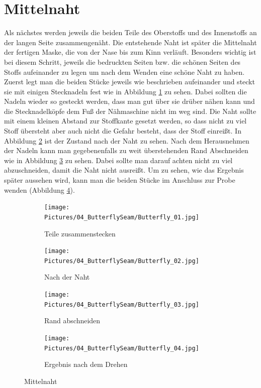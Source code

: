\documentclass[12pt,parskip=full]{scrartcl}
\begin{document}
\section{Mittelnaht}
Als nächstes werden jeweils die beiden Teile des Oberstoffs und des Innenstoffs an der langen Seite zusammengenäht. Die entstehende Naht ist später die Mittelnaht der fertigen Maske, die von der Nase bis zum Kinn verläuft. Besonders wichtig ist bei diesem Schritt, jeweils die bedruckten Seiten bzw. die schönen Seiten des Stoffs aufeinander zu legen um nach dem Wenden eine schöne Naht zu haben. Zuerst legt man die beiden Stücke jeweils wie beschrieben aufeinander und steckt sie mit einigen Stecknadeln fest wie in Abbildung \ref{Butterfly1} zu sehen. Dabei sollten die Nadeln wieder so gesteckt werden, dass man gut über sie drüber nähen kann und die Stecknadelköpfe dem Fuß der Nähmaschine nicht im weg sind. Die Naht sollte mit einem kleinen Abstand zur Stoffkante gesetzt werden, so dass nicht zu viel Stoff übersteht aber auch nicht die Gefahr besteht, dass der Stoff einreißt. In Abbildung \ref{Butterfly2} ist der Zustand nach der Naht zu sehen. Nach dem Herausnehmen der Nadeln kann man gegebenenfalls zu weit überstehenden Rand Abschneiden wie in Abbildung \ref{Butterfly3} zu sehen. Dabei sollte man darauf achten nicht zu viel abzuschneiden, damit die Naht nicht ausreißt. Um zu sehen, wie das Ergebnis später aussehen wird, kann man die beiden Stücke im Anschluss zur Probe wenden (Abbildung \ref{Butterfly4}).

\begin{figure}[ht]
    \vspace{0.5cm}
    \centering
    \begin{subfigure}{0.48\textwidth}
        \centering
        \texttt{[image: Pictures/04\_ButterflySeam/Butterfly\_01.jpg]}
        \caption{Teile zusammenstecken}
        \label{Butterfly1}
    \end{subfigure}
    \begin{subfigure}{0.48\textwidth}
        \centering
        \texttt{[image: Pictures/04\_ButterflySeam/Butterfly\_02.jpg]}
        \caption{Nach der Naht}
        \label{Butterfly2}
    \end{subfigure}
    \begin{subfigure}{0.48\textwidth}
        \centering
        \texttt{[image: Pictures/04\_ButterflySeam/Butterfly\_03.jpg]}
        \caption{Rand abschneiden}
        \label{Butterfly3}
    \end{subfigure}
    \begin{subfigure}{0.48\textwidth}
        \centering
        \texttt{[image: Pictures/04\_ButterflySeam/Butterfly\_04.jpg]}
        \caption{Ergebnis nach dem Drehen}
        \label{Butterfly4}
    \end{subfigure}
    \caption{Mittelnaht}
    \label{Butterfly}
\end{figure}
\end{document}
